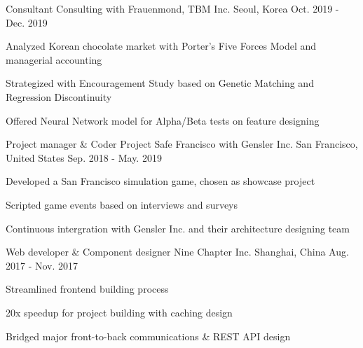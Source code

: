 \begin{cventries}
  \cventry
    {Consultant}
    {Consulting with Frauenmond, TBM Inc.}
    {Seoul, Korea}
    {Oct. 2019 - Dec. 2019}
    {
      \begin{cvitems}
        \item {Analyzed Korean chocolate market with Porter's Five Forces Model and managerial accounting}
        \item {Strategized with Encouragement Study based on Genetic Matching and Regression Discontinuity}
        \item {Offered Neural Network model for Alpha/Beta tests on feature designing}
      \end{cvitems}
    }

  \cventry
    {Project manager \& Coder}
    {Project Safe Francisco with Gensler Inc.}
    {San Francisco, United States}
    {Sep. 2018 - May. 2019}
    {
      \begin{cvitems}
        \item {Developed a San Francisco simulation game, chosen as showcase project}
        \item {Scripted game events based on interviews and surveys}
        \item {Continuous intergration with Gensler Inc. and their architecture designing team}
      \end{cvitems}
    }

  \cventry
    {Web developer \& Component designer}
    {Nine Chapter Inc.}
    {Shanghai, China}
    {Aug. 2017 - Nov. 2017}
    {
      \begin{cvitems}
        \item {Streamlined frontend building process}
        \item {20x speedup for project building with caching design}
        \item {Bridged major front-to-back communications \& REST API design}
      \end{cvitems}
    }



\end{cventries}
